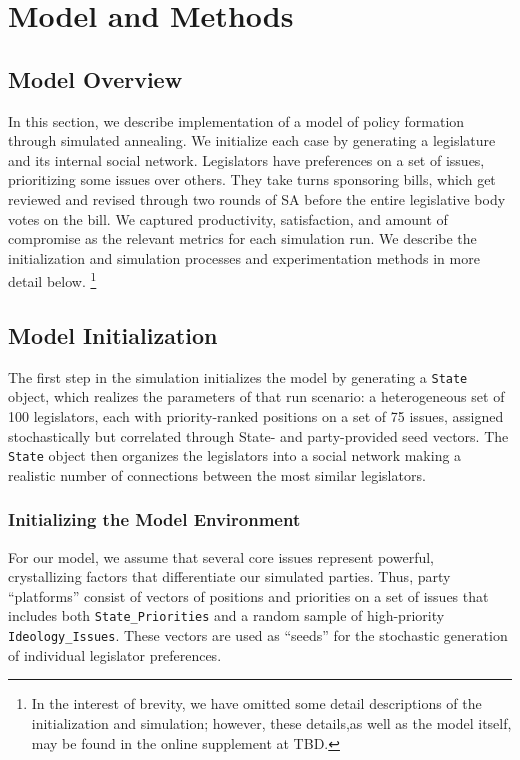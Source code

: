 \documentclass[pdftex,12pt,oribibl]{llncs}
\begin{document}
\section{Model and Methods}
%
%

\subsection{Model Overview}
In this section, we describe implementation of a model of policy formation through simulated annealing.
We initialize each case by generating a legislature and its internal social network. 
Legislators have preferences on a set of issues, prioritizing some issues over others.
They take turns sponsoring bills, which get reviewed and revised through two rounds of SA before the entire legislative body votes on the bill.
We captured productivity, satisfaction, and amount of compromise as the relevant metrics for each simulation run.
We describe the initialization and simulation processes and experimentation methods in more detail below.
\footnote{In the interest of brevity, we have omitted some detail descriptions of the initialization and simulation; however, these details,as well as the model itself, may be found in the online supplement at TBD.}

\subsection{Model Initialization}
The first step in the simulation initializes the model by generating a \texttt{State} object, which realizes the parameters of that run scenario: a heterogeneous set of 100 legislators, each with priority-ranked positions on a set of 75 issues, assigned stochastically but correlated through State- and party-provided seed vectors. 
The \texttt{State} object then organizes the legislators into a social network making a realistic number of connections between the most similar legislators.

\subsubsection{Initializing the Model Environment}
For our model, we assume that several core issues represent powerful, crystallizing factors that differentiate our simulated parties.
Thus, party ``platforms'' consist of vectors of positions and priorities on a set of issues that includes both \texttt{State\_Priorities} and a random sample of high-priority \texttt{Ideology\_Issues}.
These vectors are used as ``seeds'' for the stochastic generation of individual legislator preferences.
\end{document}
